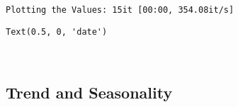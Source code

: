 \documentclass[11pt]{article}
\makeatletter
\newcommand{\boxspacing}{\kern\kvtcb@left@rule\kern\kvtcb@boxsep}
\newcommand{\prompt}[4]{
        {\ttfamily\llap{{\color{#2}[#3]:\hspace{3pt}#4}}\vspace{-\baselineskip}}
    }
\makeatother
\begin{document}
    \begin{Verbatim}[commandchars=\\\{\}]
Plotting the Values: 15it [00:00, 354.08it/s]
    \end{Verbatim}

            \begin{tcolorbox}[breakable, size=fbox, boxrule=.5pt, pad at break*=1mm, opacityfill=0]
\prompt{Out}{outcolor}{63}{\boxspacing}
\begin{Verbatim}[commandchars=\\\{\}]
Text(0.5, 0, 'date')
\end{Verbatim}
\end{tcolorbox}
        
    \begin{center}
    \end{center}
    { \hspace*{\fill} \\}
    
    \subsection{Trend and Seasonality}\label{trend-and-seasonality}
\end{document}
